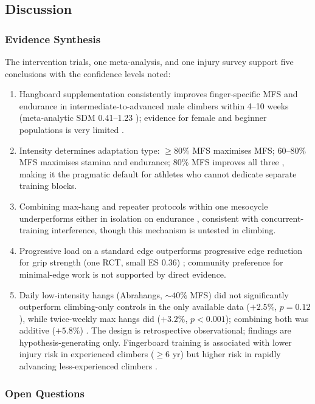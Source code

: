 \subsection{Discussion}

\subsubsection{Evidence Synthesis}

The intervention trials, one meta-analysis, and one injury survey support five conclusions with the confidence levels noted:
\begin{enumerate}[noitemsep, topsep=2pt]
  \item Hangboard supplementation consistently improves finger-specific MFS and endurance in intermediate-to-advanced male climbers within 4--10 weeks (meta-analytic SDM 0.41--1.23 \cite{SO23}); evidence for female and beginner populations is very limited \cite{LAS24}.
  \item Intensity determines adaptation type: $\geq80\%$ MFS maximises MFS; 60--80\% MFS maximises stamina and endurance; 80\% MFS improves all three \cite{DO22}, making it the pragmatic default for athletes who cannot dedicate separate training blocks.
  \item Combining max-hang and repeater protocols within one mesocycle underperforms either in isolation on endurance \cite{LRGB19}, consistent with concurrent-training interference, though this mechanism is untested in climbing.
  \item Progressive load on a standard edge outperforms progressive edge reduction for grip strength (one RCT, small ES 0.36) \cite{MSA+21}; community preference for minimal-edge work is not supported by direct evidence.
  \item Daily low-intensity hangs (Abrahangs, ${\sim}40\%$ MFS) did not significantly outperform climbing-only controls in the only available data ($+2.5\%$, $p = 0.12$), while twice-weekly max hangs did ($+3.2\%$, $p < 0.001$); combining both was additive ($+5.8\%$) \cite{GKAO24}. The design is retrospective observational; findings are hypothesis-generating only. Fingerboard training is associated with lower injury risk in experienced climbers ($\geq6$ yr) but higher risk in rapidly advancing less-experienced climbers \cite{SGJ23}.
\end{enumerate}

\subsubsection{Open Questions}

